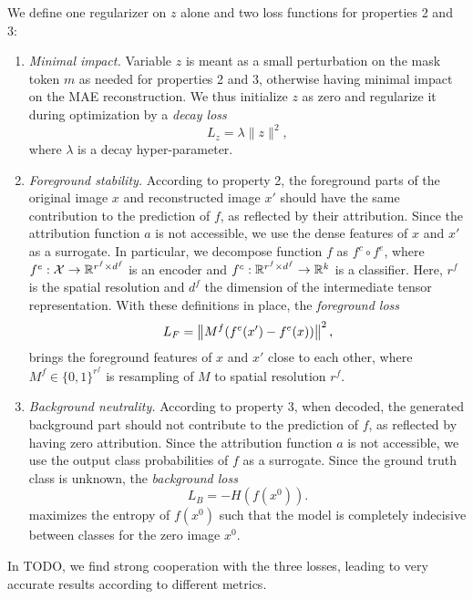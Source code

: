 We define one regularizer on $z$ alone and two loss functions for properties 2 and 3:
\begin{enumerate}
	\item \emph{Minimal impact.} Variable $z$ is meant as a small perturbation on the mask token $m$ as needed for properties 2 and 3, otherwise having minimal impact on the MAE reconstruction. We thus \alert{initialize $z$ as zero} and regularize it during optimization by a \emph{decay loss}
	\begin{equation}
		L_z = \lambda \|z\|^2,
	\end{equation}
	where $\lambda$ is a decay hyper-parameter.
	
	\item \emph{Foreground stability.} According to property 2, the foreground parts of the original image $x$ and reconstructed image $x'$ should have the same contribution to the prediction of $f$, as reflected by their attribution. Since the attribution function $a$ is not accessible, we use the dense features of $x$ and $x'$ as a surrogate. In particular, we decompose function $f$ as $f^c \circ f^e$, where $f^e: \mathcal{X} \to \mathbb{R}^{r^f \times d^f}$ is an encoder and $f^c: \mathbb{R}^{r^f \times d^f} \to \mathbb{R}^k$ is a classifier. Here, $r^f$ is the spatial resolution and $d^f$ the dimension of the intermediate tensor representation. With these definitions in place, the \emph{foreground loss}
	\begin{equation}
		L_F = \left\|{M^f(f^e(x') - f^e(x))}\right\|^2,
	\end{equation}
	brings the foreground features of $x$ and $x'$ close to each other, where $M^f \in \{0,1\}^{r^f}$ is resampling of $M$ to spatial resolution $r^f$.

	\item \emph{Background neutrality.} According to property 3, when decoded, the generated background part should not contribute to the prediction of $f$, as reflected by having zero attribution. Since the attribution function $a$ is not accessible, we use the output class probabilities of $f$ as a surrogate. Since the ground truth class is unknown, the \emph{background loss}
	\begin{equation}
		L_B = -H(f(x^0)).
	\end{equation}
	maximizes the entropy of $f(x^0)$ such that the model is completely indecisive between classes for the zero image $x^0$.
\end{enumerate}

In TODO, we find strong cooperation with the three losses, leading to very accurate results according to different metrics. 